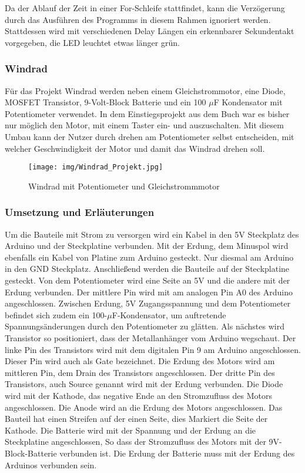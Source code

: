 Da der Ablauf der Zeit in einer For-Schleife stattfindet, kann die Verzögerung durch das Ausführen des Programms in diesem Rahmen ignoriert werden. Stattdessen wird mit verschiedenen Delay Längen ein erkennbarer Sekundentakt vorgegeben, die LED leuchtet etwas länger grün. 

\subsubsection{Windrad}

Für das Projekt Windrad werden neben einem Gleichstrommotor, eine Diode, MOSFET Transistor, 9-Volt-Block Batterie und ein 100 $\mu$F Kondensator mit Potentiometer verwendet. In dem Einstiegsprojekt aus dem Buch war es bisher nur möglich den Motor, mit einem Taster ein- und auszuschalten. Mit diesem Umbau kann der Nutzer durch drehen am Potentiometer selbst entscheiden, mit welcher Geschwindigkeit der Motor und damit das Windrad drehen soll.
\\

\begin{figure}[h]
\begin{center}
\texttt{[image: img/Windrad\_Projekt.jpg]}
\caption{Windrad mit Potentiometer und Gleichstrommmotor}
\label{Windrad_project}
\end{center}
\end{figure}
\subsubsection{Umsetzung und Erläuterungen}
Um die Bauteile mit Strom zu versorgen wird ein Kabel in den 5V Steckplatz des Arduino und der Steckplatine verbunden. Mit der Erdung, dem Minuspol wird ebenfalls ein Kabel von Platine zum Arduino gesteckt. Nur diesmal am Arduino in den GND Steckplatz. Anschließend werden die Bauteile auf der Steckplatine gesteckt. Von dem Potentiometer wird eine Seite an 5V und die andere mit der Erdung verbunden. Der mittlere Pin wird mit am analogen Pin A0 des Arduino angeschlossen. Zwischen Erdung, 5V Zugangsspannung und dem Potentiometer befindet sich zudem ein 100-$\mu$F-Kondensator, um auftretende Spannungsänderungen durch den Potentiometer zu glätten. Als nächstes wird Transistor so positioniert, dass der Metallanhänger vom Arduino wegschaut. Der linke Pin des Transistors wird mit dem digitalen Pin 9 am Arduino angeschlossen. Dieser Pin wird auch als Gate bezeichnet. Die Erdung des Motors wird am mittleren Pin, dem Drain des Transistors angeschlossen. Der dritte Pin des Transistors, auch Source genannt wird mit der Erdung verbunden. Die Diode wird mit der Kathode, das negative Ende an den Stromzufluss des Motors angeschlossen. Die Anode wird an die Erdung des Motors angeschlossen. Das Bauteil hat einen Streifen auf der einen Seite, dies Markiert die Seite der Kathode. Die Batterie wird mit der Spannung und der Erdung an die Steckplatine angeschlossen, So dass der Stromzufluss des Motors mit der 9V-Block-Batterie verbunden ist. Die Erdung der Batterie muss mit der Erdung des Arduinos verbunden sein.
\\

